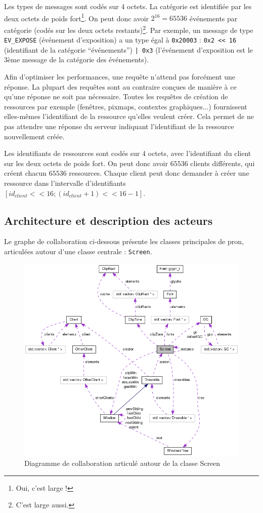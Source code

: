 \vspace{1em}

Les types de messages sont codés sur 4 octets. La catégorie est identifiée par les deux octets de poids fort\footnote{Oui, c'est large !}. On peut donc avoir $2^{16} = 65536$ événements par catégorie (codés sur les deux octets restants)\footnote{C'est large aussi.}. Par exemple, un message de type \verb|EV_EXPOSE| (événement d'exposition) a un type égal à \verb|0x20003| : \verb|0x2 << 16| (identifiant de la catégorie ``événements'') \verb=| 0x3= (l'événement d'exposition est le 3ème message de la catégorie des événements).

Afin d'optimiser les performances, une requête n'attend pas forcément une réponse. La plupart des requêtes sont au contraire conçues de manière à ce qu'une réponse ne soit pas nécessaire. Toutes les requêtes de création de ressources par exemple (fenêtres, pixmaps, contextes graphiques...) fournissent elles-mêmes l'identifiant de la ressource qu'elles veulent créer. Cela permet de ne pas attendre une réponse du serveur indiquant l'identifiant de la ressource nouvellement créée.

Les identifiants de ressources sont codés sur 4 octets, avec l'identifiant du client sur les deux octets de poids fort. On peut donc avoir $65536$ clients différents, qui créent chacun $65536$ ressources. Chaque client peut donc demander à créer une ressource dans l'intervalle d'identifiants $[id_{client} << 16 ; (id_{client} + 1) << 16 - 1]$.

\subsection{Architecture et description des acteurs}
\label{Architecture}
Le graphe de collaboration ci-dessous présente les classes principales de pron, articulées autour d'une classe centrale : \verb|Screen|.

\begin{figure}[H]
  \centering
  \includegraphics[width=14cm]{images/collab_screen.png}
  \caption{Diagramme de collaboration articulé autour de la classe Screen}
\end{figure}

